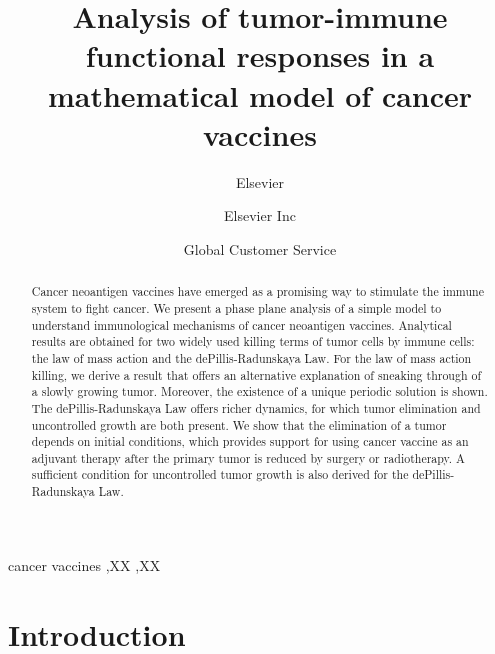 \documentclass[review,authoryear]{elsarticle}
\begin{document}
\begin{frontmatter}

\title{Analysis of tumor-immune functional responses in a mathematical model
of cancer vaccines}


\author{Elsevier}
\address{Radarweg 29, Amsterdam}

\author[mymainaddress,mysecondaryaddress]{Elsevier Inc}

\author[mysecondaryaddress]{Global Customer Service}

\address[mymainaddress]{1600 John F Kennedy Boulevard, Philadelphia}
\address[mysecondaryaddress]{360 Park Avenue South, New York}

\begin{abstract}
Cancer neoantigen vaccines have emerged as a promising way to stimulate
the immune system to fight cancer. We present a phase plane analysis
of a simple model to understand immunological mechanisms of
cancer neoantigen vaccines. Analytical results are obtained for
two widely used killing terms of tumor cells by immune cells:
the law of mass action and the dePillis-Radunskaya Law. For the law
of mass action killing, we derive a result that offers an alternative
explanation of sneaking through of a slowly growing tumor. Moreover,
the existence of a unique periodic solution is shown. The dePillis-Radunskaya
Law offers richer dynamics, for which tumor elimination and uncontrolled growth are both present. We show that the elimination of a tumor depends
on initial conditions, which provides support for using cancer vaccine
as an adjuvant therapy after the primary tumor is reduced by surgery
or radiotherapy. A sufficient condition for uncontrolled tumor growth 
is also derived for the dePillis-Radunskaya Law. 
\end{abstract}

\begin{keyword}
cancer vaccines \sep XX \sep XX
\end{keyword}

\end{frontmatter}

\linenumbers

\section{Introduction}
\end{document}

